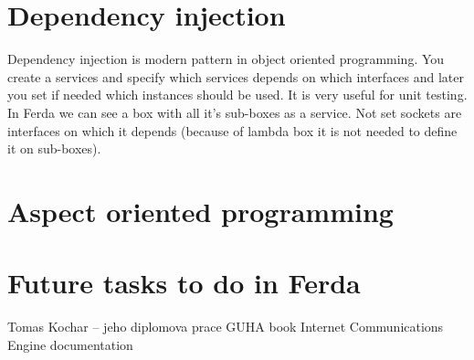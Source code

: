 \documentclass[a4paper,12pt]{book}
\begin{document}
\section{Dependency injection}
Dependency injection is modern pattern in object oriented programming. You create a services and specify which services depends on which interfaces and later you set if needed which instances should be used. It is very useful for unit testing. In Ferda we can see a box with all it's sub-boxes as a service. Not set sockets are interfaces on which it depends (because of lambda box it is not needed to define it on sub-boxes).

\section{Aspect oriented programming}
\section{Future tasks to do in Ferda}



\begin{thebibliography}{thesisKuchar}
 Tomas Kochar -- jeho diplomova prace
 GUHA book
 Internet Communications Engine documentation
\end{thebibliography}
\end{document}
